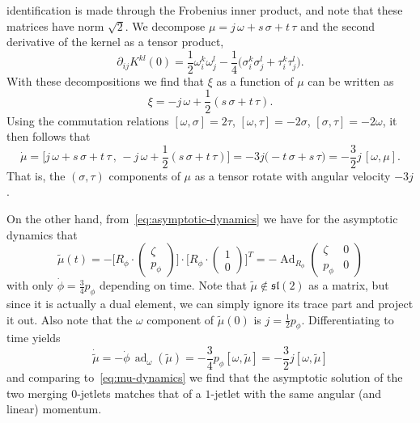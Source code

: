 \documentclass[12pt]{amsart}
\DeclareMathOperator{\Ad}{Ad}
\DeclareMathOperator{\ad}{ad}
\begin{document}
identification is made through the Frobenius inner product, and note
that these matrices have norm $\sqrt{2}$. We decompose
$\mu = j\,\omega + s\,\sigma + t\,\tau$ and the second derivative of
the kernel as a tensor product,
\begin{equation*}
  \partial_{ij} K^{kl}(0)
  = \frac{1}{2} \omega_i^k \omega_j^l
   -\frac{1}{4} \big( \sigma_i^k \sigma_j^l + \tau_i^k \tau_j^l \big).
\end{equation*}
With these decompositions we find that $\xi$ as a function of $\mu$
can be written as
\begin{equation*}
  \xi = -j\,\omega + \frac{1}{2}(s\,\sigma + t\,\tau).
\end{equation*}
Using the commutation relations $[\omega,\sigma] = 2\tau$,
$[\omega,\tau] = -2\sigma$, $[\sigma,\tau] = -2\omega$, it then
follows that
\begin{equation}\label{eq:mu-dynamics}
  \dot{\mu}
  = \big[j\,\omega+s\,\sigma+t\,\tau \,,\, -j\,\omega + \frac{1}{2}(s\,\sigma + t\,\tau)\big]
  = -3j\big(-t\,\sigma + s\,\tau\big)
  = -\frac{3}{2}j\,[\omega,\mu].
\end{equation}
That is, the $(\sigma,\tau)$ components of $\mu$ as a tensor rotate
with angular velocity $-3j$.

On the other hand, from~\eqref{eq:asymptotic-dynamics} we have for the
asymptotic dynamics that
\begin{equation*}
  \tilde{\mu}(t)
  = -\Big[R_\phi \cdot \begin{pmatrix} \zeta \\ p_\phi \end{pmatrix}\Big] \cdot
     \Big[R_\phi \cdot \begin{pmatrix} 1   \\ 0         \end{pmatrix}\Big]^T
  = -\Ad_{R_\phi} \begin{pmatrix} \zeta & 0 \\ p_\phi & 0 \end{pmatrix}
\end{equation*}
with only $\dot{\phi} = \frac{3}{4} p_\phi$ depending on time.
Note that $\tilde{\mu} \not\in \mathfrak{sl}(2)$ as a matrix, but
since it is actually a dual element, we can simply ignore its trace
part and project it out. Also note that the $\omega$ component of
$\tilde{\mu}(0)$ is $j = \frac{1}{2}p_\phi$. Differentiating to
time yields
\begin{equation*}
  \dot{\tilde{\mu}}
  = -\dot{\phi}\,\ad_\omega(\tilde{\mu})
  = -\frac{3}{4} p_\phi [\omega,\tilde{\mu}]
  = -\frac{3}{2} j [\omega,\tilde{\mu}]
\end{equation*}
and comparing to~\eqref{eq:mu-dynamics} we find that the asymptotic
solution of the two merging $0$-jetlets matches that of a $1$-jetlet
with the same angular (and linear) momentum.
\end{document}
